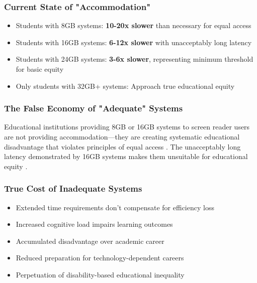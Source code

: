 \subsubsection{Current State of "Accommodation"}

\begin{itemize}
\item Students with 8GB systems: \textbf{10-20x slower} than necessary for equal access \cite{EducationalEquityReport2024}
\item Students with 16GB systems: \textbf{6-12x slower} with unacceptably long latency \cite{EducationalEquityReport2024}
\item Students with 24GB systems: \textbf{3-6x slower}, representing minimum threshold for basic equity \cite{EducationalEquityReport2024}
\item Only students with 32GB+ systems: Approach true educational equity \cite{EducationalEquityReport2024}
\end{itemize}

\subsubsection{The False Economy of "Adequate" Systems}
Educational institutions providing 8GB or 16GB systems to screen reader users are not providing accommodation—they are creating systematic educational disadvantage that violates principles of equal access \cite{ADA1990, Section504RehabAct}. The unacceptably long latency demonstrated by 16GB systems makes them unsuitable for educational equity \cite{EducationalEquityReport2024}.

\subsubsection{True Cost of Inadequate Systems}

\begin{itemize}
\item Extended time requirements don't compensate for efficiency loss \cite{Fowler2011ScreenReaderLatency}
\item Increased cognitive load impairs learning outcomes \cite{Sweller1988CognitiveLoadTheory}
\item Accumulated disadvantage over academic career \cite{Warschauer2003TechnologyAndSocialInclusion}
\item Reduced preparation for technology-dependent careers \cite{DigitalSkillsGap}
\item Perpetuation of disability-based educational inequality \cite{ADA1990, Section504RehabAct}
\end{itemize}


